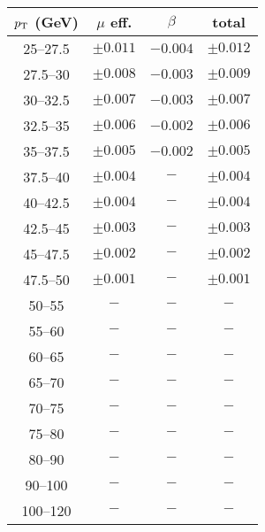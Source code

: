 \begin{tabular}{c|cc|c}
$p_\text{T}$ (GeV)  & $\mu$ eff. & $\beta$ & total \\
\hline
25--27.5 & $\pm0.011$ & $-0.004$ & $\pm0.012$\\
27.5--30 & $\pm0.008$ & $-0.003$ & $\pm0.009$\\
30--32.5 & $\pm0.007$ & $-0.003$ & $\pm0.007$\\
32.5--35 & $\pm0.006$ & $-0.002$ & $\pm0.006$\\
35--37.5 & $\pm0.005$ & $-0.002$ & $\pm0.005$\\
37.5--40 & $\pm0.004$ & $-$ & $\pm0.004$\\
40--42.5 & $\pm0.004$ & $-$ & $\pm0.004$\\
42.5--45 & $\pm0.003$ & $-$ & $\pm0.003$\\
45--47.5 & $\pm0.002$ & $-$ & $\pm0.002$\\
47.5--50 & $\pm0.001$ & $-$ & $\pm0.001$\\
50--55 & $-$ & $-$ & $-$\\
55--60 & $-$ & $-$ & $-$\\
60--65 & $-$ & $-$ & $-$\\
65--70 & $-$ & $-$ & $-$\\
70--75 & $-$ & $-$ & $-$\\
75--80 & $-$ & $-$ & $-$\\
80--90 & $-$ & $-$ & $-$\\
90--100 & $-$ & $-$ & $-$\\
100--120 & $-$ & $-$ & $-$\\
\end{tabular}
